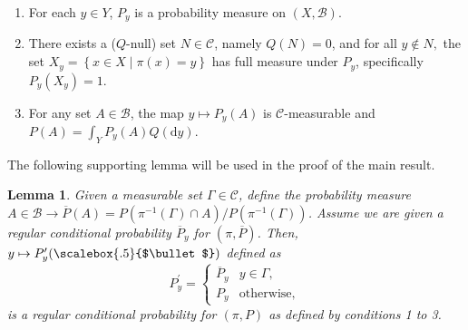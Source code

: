 \documentclass{amsart}
\newtheorem{lemma}{Lemma}
\renewcommand{\cdot}[1][.5]{%
  \mathbin{\vcenter{\hbox{\scalebox{#1}{$\bullet$}}}}%
}
\begin{document}
\begin{enumerate}
\item For each $y\in Y$, $P_{y}$ is a probability measure on $(X,\mathcal{B})$.
\item There exists a ($Q$-null) set $N\in\mathcal{C}$, namely $Q(N)=0$,
and for all $y\notin N,$ the set $X_{y}=\left\{ x\in X\mid\pi(x)=y\right\} $
has full measure under $P_{y}$, specifically $P_{y}(X_{y})=1$.
\item For any set $A\in\mathcal{B}$, the map $y \mapsto P_{y}(A)$ is
$\mathcal{C}$-measurable and $P(A)=\int_{Y}P_{y}(A)Q(\mathrm{d}y)$.
\end{enumerate}

The following supporting lemma will be used in the proof of the main result.

\begin{lemma}\label{lem:complete_diaconis}
Given a measurable set $\Gamma\in\mathcal{C}$, define the probability measure
$A\in\mathcal{B}\rightarrow\overline{P}(A)=P(\pi^{-1}(\Gamma)\cap A)/P(\pi^{-1}(\Gamma))$.
Assume we are given a regular conditional probability $\overline{P}_{y}$ for $(\pi,\overline{P})$. Then, $y\mapsto P_{y}^\prime(\cdot)$ defined
as 
\[
P_{y}^\prime=\begin{cases}
\overline{P}_{y} & y\in\Gamma,\\
P_{y} & \mathrm{otherwise,}
\end{cases}
\]
is a regular conditional probability for $(\pi,P)$ as defined by
conditions 1 to 3. 
\end{lemma}
\end{document}
